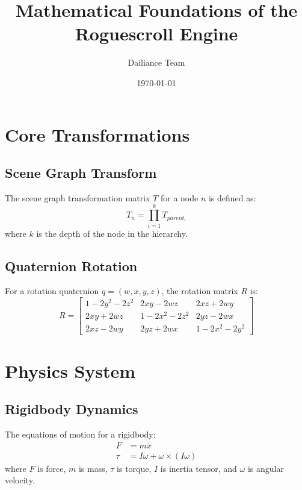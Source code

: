 \documentclass{article}
\title{Mathematical Foundations of the Roguescroll Engine}
\author{Dailiance Team}
\date{\today}
\begin{document}
\maketitle

\section{Core Transformations}

\subsection{Scene Graph Transform}
The scene graph transformation matrix $T$ for a node $n$ is defined as:
\begin{equation}
T_n = \prod_{i=1}^{k} T_{parent_i}
\end{equation}
where $k$ is the depth of the node in the hierarchy.

\subsection{Quaternion Rotation}
For a rotation quaternion $q = (w, x, y, z)$, the rotation matrix $R$ is:
\begin{equation}
R = \begin{bmatrix}
1-2y^2-2z^2 & 2xy-2wz & 2xz+2wy \\
2xy+2wz & 1-2x^2-2z^2 & 2yz-2wx \\
2xz-2wy & 2yz+2wx & 1-2x^2-2y^2
\end{bmatrix}
\end{equation}

\section{Physics System}

\subsection{Rigidbody Dynamics}
The equations of motion for a rigidbody:
\begin{equation}
\begin{aligned}
F &= m\ddot{x} \\
\tau &= I\dot{\omega} + \omega \times (I\omega)
\end{aligned}
\end{equation}
where $F$ is force, $m$ is mass, $\tau$ is torque, $I$ is inertia tensor, and $\omega$ is angular velocity.
\end{document}
